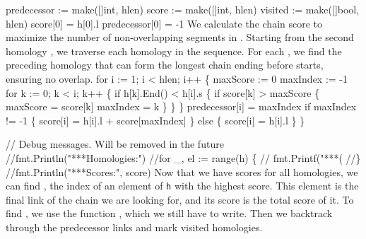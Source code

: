 predecessor := make([]int, hlen)
score := make([]int, hlen)
visited := make([]bool, hlen)
score[0] = h[0].l
predecessor[0] = -1
\nwendcode{}\nwdocspar
We calculate the chain score to maximize the number of non-overlapping
segments in . Starting from the second homology , we
traverse each homology  in the sequence. For each ,
we find the preceding homology  that can form the longest
chain ending before  starts, ensuring no overlap.
\nwenddocs{}\endmoddef\nwstartdeflinemarkup{}\nwenddeflinemarkup
for i := 1; i < hlen; i++ \{
          maxScore := 0
          maxIndex := -1
          for k := 0; k < i; k++ \{
                  if h[k].End() < h[i].s \{
                          if score[k] > maxScore \{
                                  maxScore = score[k]
                                  maxIndex = k
                          \}
                  \}
          \}
          predecessor[i] = maxIndex
          if maxIndex != -1 \{
              score[i] = h[i].l + score[maxIndex]
          \} else \{
              score[i] = h[i].l
          \}
\}

// Debug messages. Will be removed in the future
//fmt.Println("***Homologies:")
//for _, el := range(h) \{
//      fmt.Printf("***(%
//\}
//fmt.Println("***Scores:", score)
\nwendcode{}\nwdocspar
Now that we have scores for all homologies, we can find , the
index of an element of \texttt{h} with the highest score. This element
is the final link of the chain we are looking for, and its score is
the total score of it. To find , we use the function
, which we still have to write. Then we backtrack
through the predecessor links and mark visited homologies.

